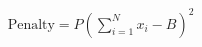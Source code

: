 \documentclass[preview]{standalone}
\begin{document}
\begin{align*}
\text{Penalty} = P \left( \sum_{i=1}^N x_i - B \right)^2
\end{align*}
\end{document}
